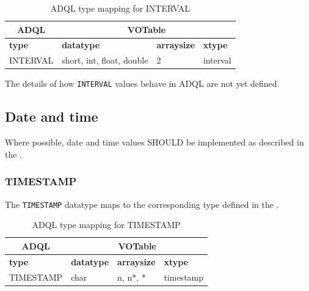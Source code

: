 \documentclass[11pt,a4paper]{ivoa}
\begin{document}
\begin{table}[th]\footnotesize
    \begin{tabular}
        {|p{}|p{}|p{}|p{}|}
        
        \hline
        \multicolumn{1}{|c|}{\textbf{ADQL}} &
        \multicolumn{3}{|c|}{\textbf{VOTable}}
        \tabularnewline
        
        \hline
        \textbf{type} &
        \textbf{datatype} &
        \textbf{arraysize} &
        \textbf{xtype}
        \tabularnewline

        \hline
        INTERVAL &
        short, int, float, double &
        2 &
        interval
        \tabularnewline
        \hline
    \end{tabular}
    \caption{ADQL type mapping for INTERVAL}
    \label{table:types.numeric.interval}
\end{table}

The details of how \verb:INTERVAL: values behave in ADQL are not yet
defined.

\subsection{Date and time}
\label{sec:types.datetime}

Where possible, date and time values SHOULD be implemented as described in the
\DALISpec{}.

\subsubsection{TIMESTAMP}
\label{sec:types.datetime.timestamp}

The \verb:TIMESTAMP: datatype maps to the corresponding type defined in the
\DALISpec{}.

\begin{table}[th]\footnotesize
    \begin{tabular}
        {|p{}|p{}|p{}|p{}|}
        
        \hline
        \multicolumn{1}{|c|}{\textbf{ADQL}} &
        \multicolumn{3}{|c|}{\textbf{VOTable}}
        \tabularnewline
        
        \hline
        \textbf{type} &
        \textbf{datatype} &
        \textbf{arraysize} &
        \textbf{xtype}
        \tabularnewline

        \hline
        TIMESTAMP &
        char &
        n, n*, * &
        timestamp
        \tabularnewline
        \hline
    \end{tabular}
    \caption{ADQL type mapping for TIMESTAMP}
    \label{table:types.datetime.timestamp}
\end{table}
\end{document}
